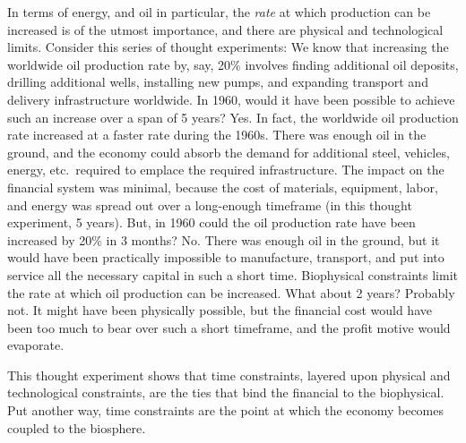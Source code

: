 In terms of energy, and oil in particular, 
the \emph{rate} at which production can be increased 
is of the utmost importance, and
there are physical and technological limits. 
Consider this series of thought experiments:
We know that increasing the worldwide oil production rate by, say, 20\% 
involves
finding additional oil deposits, 
drilling additional wells, 
installing new pumps,
and expanding transport and delivery infrastructure worldwide.
In 1960, would it have been possible to achieve such an increase 
over a span of 5 years?
Yes. 
In fact, the worldwide oil production rate increased at a faster rate 
during the 1960s.
There was enough oil in the ground, 
and the economy could absorb the demand 
for additional steel, vehicles, energy, etc.\ required to emplace
the required infrastructure.
The impact on the financial system was minimal, 
because the cost of materials, equipment, labor, and energy
was spread out over a long-enough timeframe (in this thought experiment, 5 years). 
But, in 1960 could the oil production rate have been increased 
by 20\% in 3 months?
No.
There was enough oil in the ground,
but it would have been practically impossible to manufacture,
transport, and put into service all the necessary capital in such a short time.
Biophysical constraints limit the rate at which oil production can be increased.
What about 2 years?
Probably not.
It might have been physically possible, 
but the financial cost would have been too much to bear over such a short timeframe,
and the profit motive would evaporate.

This thought experiment shows that time constraints,
layered upon physical and technological constraints, 
are the ties that bind the financial to the biophysical.
Put another way, time constraints are the point at which the economy 
becomes coupled to the biosphere.

